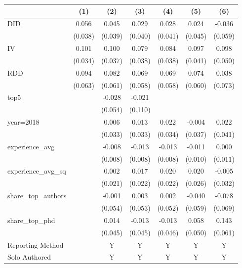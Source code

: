 \begin{tabular}{l*{6}{c}}
\hline\hline
                &\multicolumn{1}{c}{(1)}&\multicolumn{1}{c}{(2)}&\multicolumn{1}{c}{(3)}&\multicolumn{1}{c}{(4)}&\multicolumn{1}{c}{(5)}&\multicolumn{1}{c}{(6)}\\
\hline
DID             &    0.056&    0.045&    0.029&    0.028&    0.024&   -0.036\\
                &  (0.038)&  (0.039)&  (0.040)&  (0.041)&  (0.045)&  (0.059)\\
IV              &    0.101&    0.100&    0.079&    0.084&    0.097&    0.098\\
                &  (0.034)&  (0.037)&  (0.038)&  (0.038)&  (0.041)&  (0.050)\\
RDD             &    0.094&    0.082&    0.069&    0.069&    0.074&    0.038\\
                &  (0.063)&  (0.061)&  (0.058)&  (0.058)&  (0.060)&  (0.073)\\
top5            &         &   -0.028&   -0.021&         &         &         \\
                &         &  (0.054)&  (0.110)&         &         &         \\
year=2018       &         &    0.006&    0.013&    0.022&   -0.004&    0.022\\
                &         &  (0.033)&  (0.033)&  (0.034)&  (0.037)&  (0.041)\\
experience\_avg  &         &   -0.008&   -0.013&   -0.013&   -0.011&    0.000\\
                &         &  (0.008)&  (0.008)&  (0.008)&  (0.010)&  (0.011)\\
experience\_avg\_sq&         &    0.002&    0.017&    0.020&    0.020&   -0.005\\
                &         &  (0.021)&  (0.022)&  (0.022)&  (0.026)&  (0.032)\\
share\_top\_authors&         &   -0.001&    0.003&    0.002&   -0.040&   -0.078\\
                &         &  (0.054)&  (0.053)&  (0.052)&  (0.059)&  (0.069)\\
share\_top\_phd   &         &    0.014&   -0.013&   -0.013&    0.058&    0.143\\
                &         &  (0.045)&  (0.045)&  (0.046)&  (0.050)&  (0.061)\\
Reporting Method &         &        Y&        Y&        Y&        Y&        Y\\
Solo Authored   &         &        Y&        Y&        Y&        Y&        Y\\

\end{tabular}
